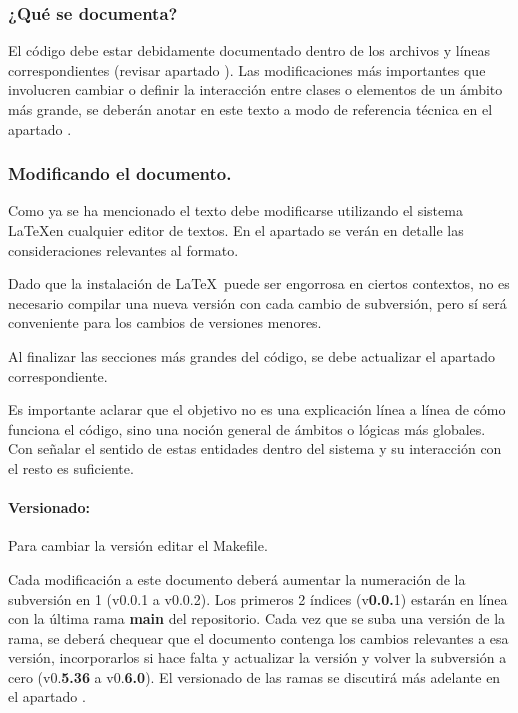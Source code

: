 \subsubsection{¿Qué se documenta?}
El código debe estar debidamente documentado dentro de los archivos y líneas correspondientes (revisar apartado ). Las modificaciones más importantes que involucren cambiar o definir la interacción entre clases o elementos de un ámbito más grande, se deberán anotar en este texto a modo de referencia técnica en el apartado .

\subsubsection{Modificando el documento.}

Como ya se ha mencionado el texto debe modificarse utilizando el sistema \LaTeX en cualquier editor de textos. En el apartado  se verán en detalle las consideraciones relevantes al formato. 

Dado que la instalación de \LaTeX\ puede ser engorrosa en ciertos contextos, no es necesario compilar una nueva versión con cada cambio de subversión, pero sí será conveniente para los cambios de versiones menores.

Al finalizar las secciones más grandes del código, se debe actualizar el apartado correspondiente.

Es importante aclarar que el objetivo no es una explicación línea a línea de cómo funciona el código, sino una noción general de ámbitos o lógicas más globales. Con señalar el sentido de estas entidades dentro del sistema y su interacción con el resto es suficiente.

\paragraph{Versionado:}
Para cambiar la versión editar el Makefile.

Cada modificación a este documento deberá aumentar la numeración de la subversión en 1 (v0.0.1 a v0.0.2). Los primeros 2 índices (v\textbf{0.0.}1) estarán en línea con la última rama \textbf{main} del repositorio. Cada vez que se suba una versión de la rama, se deberá chequear que el documento contenga los cambios relevantes a esa versión, incorporarlos si hace falta y actualizar la versión y volver la subversión a cero (v0.\textbf{5.36} a v0.\textbf{6.0}). El versionado de las ramas se discutirá más adelante en el apartado .

